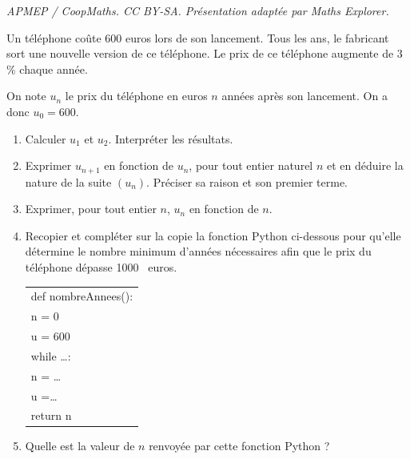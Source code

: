 \documentclass[10pt]{article}
\providecommand{\np}[2][]{{#2~#1}}
\begin{document}
\noindent\textit{APMEP / CoopMaths. CC BY-SA. Présentation adaptée par Maths Explorer.}\par\medskip
\medskip

Un téléphone coûte $600$ euros lors de son lancement. Tous les ans, le fabricant sort une
nouvelle version de ce téléphone. Le prix de ce téléphone augmente de 3\,\% chaque année.

On note $u_n$ le prix du téléphone en euros $n$ années après son lancement. On a donc
$u_0 = 600$.

\medskip

\begin{enumerate}
\item Calculer $u_1$ et $u_2$. Interpréter les résultats.
\item Exprimer $u_{n+1}$ en fonction de $u_n$, pour tout entier naturel $n$ et en déduire la nature de
la suite $\left(u_n\right)$. Préciser sa raison et son premier terme.
\item Exprimer, pour tout entier $n$, $u_n$ en fonction de $n$.
\item Recopier et compléter sur la copie la fonction Python ci-dessous pour qu'elle détermine
le nombre minimum d'années nécessaires afin que le prix du téléphone dépasse \np{1000}
euros.

\begin{center}
\begin{tabular}[]{|m{12.4em}|}
\hline
def nombreAnnees():\\
n = 0\\
u = 600\\
while \dots :\\
\hspace{1em}n = \dots\\
\hspace{1em}u =\dots\\
return n\\
\hline
\end{tabular}
\end{center}
\item Quelle est la valeur de $n$ renvoyée par cette fonction Python ?
\end{enumerate}
\end{document}
